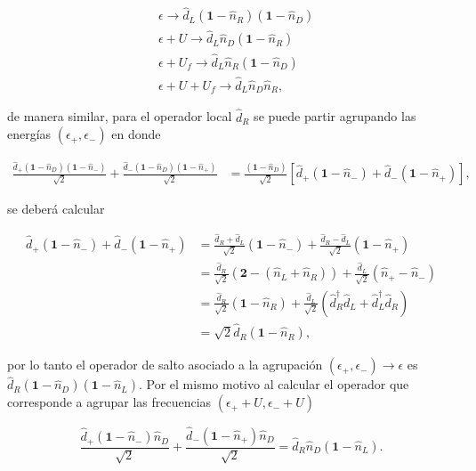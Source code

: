 \begin{appendixs}
\begin{align*}
    &\epsilon \to \hat{d}_{L}(\textbf{1}-\hat{n}_{R})(\textbf{1}-\hat{n}_{D})\\
   &\epsilon + U \to \hat{d}_{L}\hat{n}_{D}(\textbf{1}-\hat{n}_{R})\\
    &\epsilon +U_{f}\to \hat{d}_{L}\hat{n}_{R}(\textbf{1}-\hat{n}_{D})\\
    &\epsilon +U+U_{f}\to \hat{d}_{L}\hat{n}_{D}\hat{n}_{R},
\end{align*}

de manera similar, para el operador local $\hat{d}_{R}$ se puede partir agrupando las energías $(\epsilon_{+},\epsilon_{-})$ en donde

\begin{align*}
    \frac{\hat{d}_{+}(\textbf{1}-\hat{n}_{D})(\textbf{1}-\hat{n}_{-}) }{\sqrt{2}} + \frac{\hat{d}_{-}(\textbf{1}-\hat{n}_{D})(\textbf{1}-\hat{n}_{+}) }{\sqrt{2}} & = \frac{(\textbf{1} - \hat{n}_{D})}{\sqrt{2}}[\hat{d}_{+}(\textbf{1}-\hat{n}_{-}) + \hat{d}_{-}(\textbf{1}-\hat{n}_{+})],
\end{align*}

se deberá calcular 

\begin{align*}
    \hat{d}_{+}(\textbf{1}-\hat{n}_{-}) + \hat{d}_{-}(\textbf{1}-\hat{n}_{+}) & =  \frac{\hat{d}_{R} + \hat{d}_{L}}{\sqrt{2}}(\textbf{1} - \hat{n}_{-}) + \frac{\hat{d}_{R} - \hat{d}_{L}}{\sqrt{2}}(\textbf{1} - \hat{n}_{+})   \\
    & = \frac{\hat{d}_{R}}{\sqrt{2}}(\textbf{2} - (\hat{n}_{L} + \hat{n}_{R})) + \frac{\hat{d}_{L}}{\sqrt{2}} (\hat{n}_{+}-\hat{n}_{-}) \\
    & = \frac{\hat{d}_{R}}{\sqrt{2}}(\textbf{1} -  \hat{n}_{R}) + \frac{\hat{d}_{L}}{\sqrt{2}} (\hat{d}^{\dagger}_{R}\hat{d}_{L} + \hat{d}^{\dagger}_{L}\hat{d}_{R}) \\
    & = \sqrt{2}\hat{d}_{R}(\textbf{1}-\hat{n}_{R}),
\end{align*}

por lo tanto el operador de salto asociado a la agrupación $(\epsilon_{+},\epsilon_{-})\to \epsilon$ es $\hat{d}_{R}(\textbf{1}-\hat{n}_{D})(\textbf{1}-\hat{n}_{L})$. Por el mismo motivo al calcular el operador que corresponde a agrupar las frecuencias $(\epsilon_{+}+U,\epsilon_{-}+U)$ 

\begin{equation*}
    \frac{\hat{d}_{+}(\textbf{1}-\hat{n}_{-})\hat{n}_{D}}{\sqrt{2}} + \frac{\hat{d}_{-}(\textbf{1}-\hat{n}_{+})\hat{n}_{D}}{\sqrt{2}}  = \hat{d}_{R}\hat{n}_{D}(\textbf{1}-\hat{n}_{L}).
\end{equation*}


\end{appendixs}
